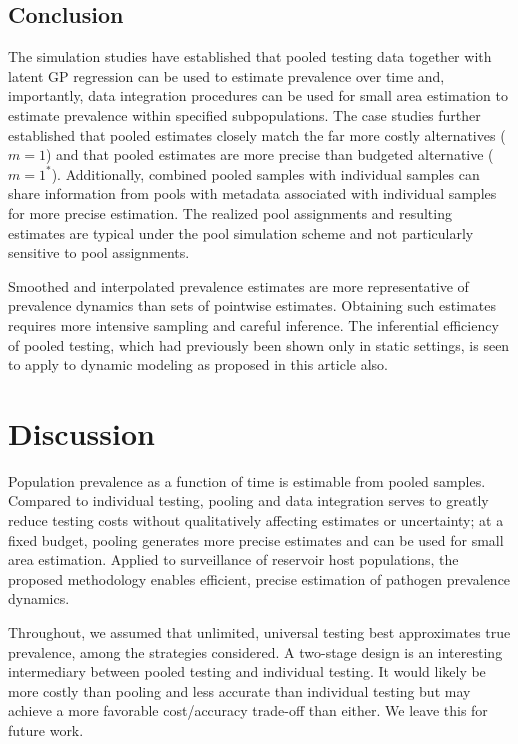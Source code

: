 \documentclass{article}
\begin{document}
\subsection{Conclusion}

The simulation studies have established that pooled testing data together with latent GP regression can be used to estimate prevalence over time and, importantly, data integration procedures can be used for small area estimation to estimate prevalence within specified subpopulations. The case studies further established that pooled estimates closely match the far more costly alternatives ($m=1$) and that pooled estimates are more precise than budgeted alternative ($m=1^*$). Additionally, combined pooled samples with individual samples can share information from pools with metadata associated with individual samples for more precise estimation. The realized pool assignments and resulting estimates are typical under the pool simulation scheme and not particularly sensitive to pool assignments.

Smoothed and interpolated prevalence estimates are more representative of prevalence dynamics than sets of pointwise estimates. Obtaining such estimates requires more intensive sampling and careful inference. The inferential efficiency of pooled testing, which had previously been shown only in static settings, is seen to apply to dynamic modeling as proposed in this article also. 

\section{Discussion}

Population prevalence as a function of time is estimable from pooled samples. Compared to individual testing, pooling and data integration serves to greatly reduce testing costs without qualitatively affecting estimates or uncertainty; at a fixed budget, pooling generates more precise estimates and can be used for small area estimation. Applied to surveillance of reservoir host populations, the proposed methodology enables efficient, precise estimation of pathogen prevalence dynamics. 

Throughout, we assumed that unlimited, universal testing best approximates true prevalence, among the strategies considered. A two-stage design is an interesting intermediary between pooled testing and individual testing. It would likely be more costly than pooling and less accurate than individual testing but may achieve a more favorable cost/accuracy trade-off than either. We leave this for future work.
\end{document}
